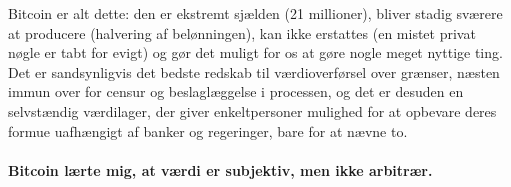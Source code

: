 Bitcoin er alt dette: den er ekstremt sjælden (21 millioner), bliver stadig 
sværere at producere (halvering af belønningen), kan ikke erstattes (en mistet 
privat nøgle er tabt for evigt) og gør det muligt for os at gøre nogle meget 
nyttige ting. Det er sandsynligvis det bedste redskab til værdioverførsel over 
grænser, næsten immun over for censur og beslaglæggelse i processen, og det 
er desuden en selvstændig værdilager, der giver enkeltpersoner mulighed for at 
opbevare deres formue uafhængigt af banker og regeringer, bare for at nævne to.

\paragraph{Bitcoin lærte mig, at værdi er subjektiv, men ikke arbitrær.}

%
%
%
%
